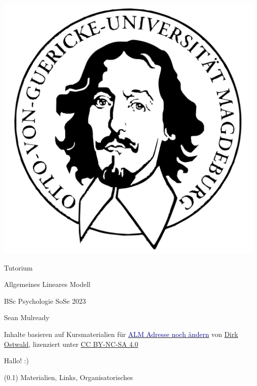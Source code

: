 \documentclass[
  8pt,
  ignorenonframetext,
]{beamer}
\author{}
\date{\vspace{-2.5em}}
\begin{document}
\begin{frame}[plain]{}
\protect\hypertarget{section}{}
\center

\begin{center}\includegraphics[width=0.2\linewidth]{../Abbildungen/wtfi_otto} \end{center}

\vspace{2mm}

\huge

Tutorium

\Large

Allgemeines Lineares Modell \vspace{4mm}

\normalsize

BSc Psychologie SoSe 2023

\vspace{12mm}
\normalsize

Sean Mulready

\vspace{3mm}
\scriptsize

Inhalte basieren auf Kursmaterialien für
\href{https://www.ipsy.ovgu.de/Institut/Abteilungen+des+Institutes/Methodenlehre+I+_+Experimentelle+und+Neurowissenschaftliche+Psychologie/Lehre/Sommersemester+2022/Allgemeines+Lineares+Modell.html}{\textcolor{darkblue}{ALM Adresse noch ändern}}
von
\href{https://www.ipsy.ovgu.de/Institut/Abteilungen+des+Institutes/Methodenlehre+I+_+Experimentelle+und+Neurowissenschaftliche+Psychologie/Team/Dirk+Ostwald.html}{Dirk
Ostwald}, lizenziert unter
\href{https://creativecommons.org/licenses/by-sa/4.0/deed.de}{CC
BY-NC-SA 4.0}
\end{frame}

\begin{frame}[plain]{}
\protect\hypertarget{section-1}{}
\huge
\center
\vfill

Hallo! :) \vfill
\end{frame}

\begin{frame}[plain]{}
\protect\hypertarget{section-2}{}
\huge
\center
\vfill

(0.1) Materialien, Links, Organisatorisches \vfill
\end{frame}
\end{document}
